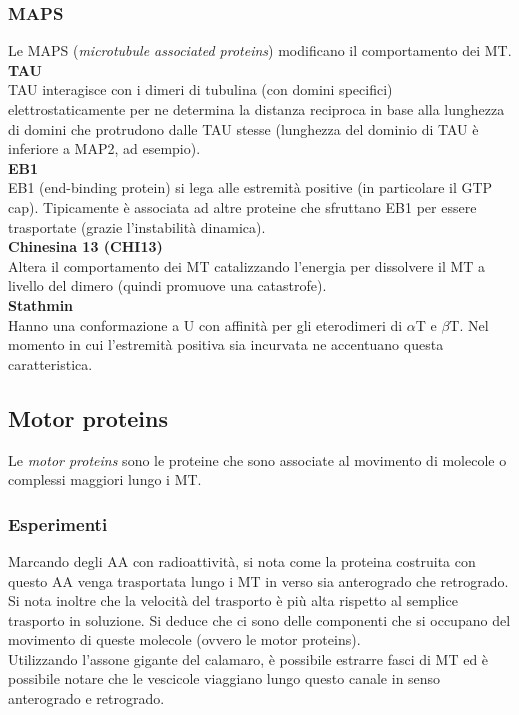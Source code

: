         \subsubsection{MAPS}
            Le MAPS (\textit{microtubule associated proteins}) modificano il comportamento dei MT.\\
            
            \textbf{TAU}\\
                TAU interagisce con i dimeri di tubulina (con domini specifici) elettrostaticamente per ne determina la distanza reciproca in base alla lunghezza di domini che protrudono dalle TAU stesse (lunghezza del dominio di TAU è inferiore a MAP2, ad esempio).\\
                
            \textbf{EB1}\\
                EB1 (end-binding protein) si lega alle estremità positive (in particolare il GTP cap). Tipicamente è associata ad altre proteine che sfruttano EB1 per essere trasportate (grazie l'instabilità dinamica).\\
                
            \textbf{Chinesina 13 (CHI13)}\\
                Altera il comportamento dei MT catalizzando l'energia per dissolvere il MT a livello del dimero (quindi promuove una catastrofe).\\
                
            \textbf{Stathmin}\\
                Hanno una conformazione a U con affinità per gli eterodimeri di $\alpha$T e $\beta$T. Nel momento in cui l'estremità positiva sia incurvata ne accentuano questa caratteristica.
        
    \subsection{Motor proteins}
        Le \textit{motor proteins} sono le proteine che sono associate al movimento di molecole o complessi maggiori lungo i MT.
        
        \subsubsection{Esperimenti}
            Marcando degli AA con radioattività, si nota come la proteina costruita con questo AA venga trasportata lungo i MT in verso sia anterogrado che retrogrado. Si nota inoltre che la velocità del trasporto è più alta rispetto al semplice trasporto in soluzione. Si deduce che ci sono delle componenti che si occupano del movimento di queste molecole (ovvero le motor proteins).\\
            Utilizzando l'assone gigante del calamaro, è possibile estrarre fasci di MT ed è possibile notare che le vescicole viaggiano lungo questo canale in senso anterogrado e retrogrado.
        
